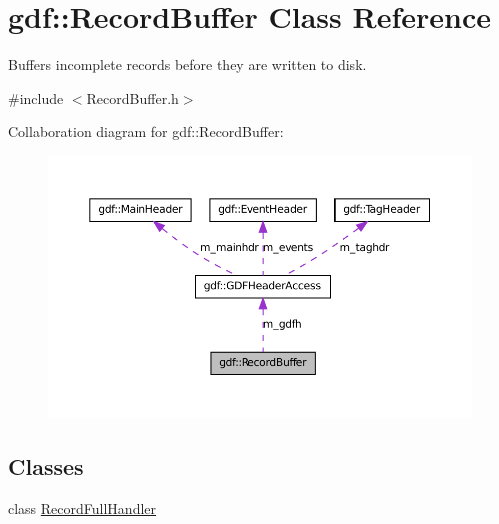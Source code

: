 \hypertarget{classgdf_1_1_record_buffer}{
\section{gdf::RecordBuffer Class Reference}
\label{classgdf_1_1_record_buffer}
}


Buffers incomplete records before they are written to disk.  




{\ttfamily \#include $<$RecordBuffer.h$>$}



Collaboration diagram for gdf::RecordBuffer:
\nopagebreak
\begin{figure}[H]
\begin{center}
\leavevmode
\includegraphics[width=398pt]{classgdf_1_1_record_buffer__coll__graph}
\end{center}
\end{figure}
\subsection*{Classes}
\begin{DoxyCompactItemize}
\item 
class \hyperlink{classgdf_1_1_record_buffer_1_1_record_full_handler}{RecordFullHandler}
\end{DoxyCompactItemize}
